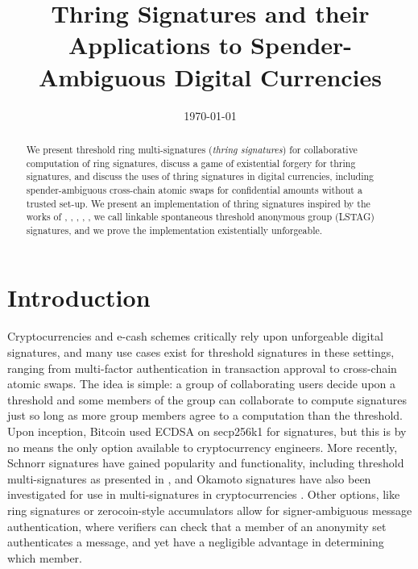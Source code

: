 \documentclass{mrl}
\title{Thring Signatures and their Applications to Spender-Ambiguous Digital Currencies}
\date{\today}
\theoremstyle{definition}
\numberwithin{theorem}{subsection}
\begin{document}

\begin{abstract}
We present threshold ring multi-signatures (\textit{thring signatures}) for collaborative computation of ring signatures, discuss a game of existential forgery for thring signatures, and discuss the uses of thring signatures in digital currencies, including spender-ambiguous cross-chain atomic swaps for confidential amounts without a trusted set-up. We present an implementation of thring signatures inspired by the works of \cite{liu2004linkable}, \cite{qian2010non}, \cite{maxwell2015confidential}, \cite{backLSAG}, \cite{noether2016ring}, \cite{maxwell2018simple} we call linkable spontaneous threshold anonymous group (LSTAG) signatures, and we prove the implementation existentially unforgeable. 
\end{abstract}

\section{Introduction}


Cryptocurrencies and e-cash schemes critically rely upon unforgeable digital signatures, and many use cases exist for threshold signatures in these settings, ranging from multi-factor authentication in transaction approval to cross-chain atomic swaps. The idea is simple: a group of collaborating users decide upon a threshold and some members of the group can collaborate to compute signatures just so long as more group members agree to a computation than the threshold. Upon inception, Bitcoin used ECDSA on secp256k1 for signatures, but this is by no means the only option available to cryptocurrency engineers. More recently, Schnorr signatures \cite{schnorr1991efficient} have gained popularity and functionality, including threshold multi-signatures as presented in \cite{maxwell2018simple}, and Okamoto signatures \cite{okamoto1992provably} have also been investigated for use in multi-signatures in cryptocurrencies \cite{drijvers2018okamoto}. Other options, like ring signatures \cite{liu2004linkable} or zerocoin-style accumulators \cite{miers2013zerocoin} allow for signer-ambiguous message authentication, where verifiers can check that a member of an anonymity set authenticates a message, and yet have a negligible advantage in determining which member. 
\end{document}
